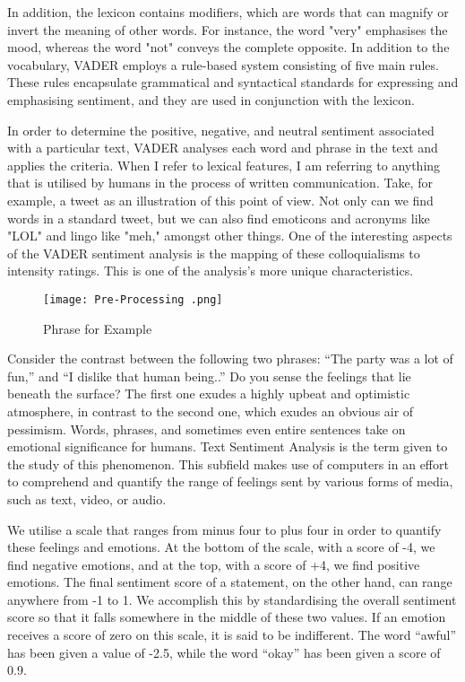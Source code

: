 \documentclass[12pt, a4paper,twoside]{report}
\theoremstyle{plain} %
\theoremstyle{definition} %
\theoremstyle{remark} %
\numberwithin{equation}{chapter}
\begin{document}
In addition, the lexicon contains modifiers, which are words that can magnify or invert the meaning of other words. For instance, the word "very" emphasises the mood, whereas the word "not" conveys the complete opposite. In addition to the vocabulary, VADER employs a rule-based system consisting of five main rules. These rules encapsulate grammatical and syntactical standards for expressing and emphasising sentiment, and they are used in conjunction with the lexicon. 

In order to determine the positive, negative, and neutral sentiment associated with a particular text, VADER analyses each word and phrase in the text and applies the criteria. When I refer to lexical features, I am referring to anything that is utilised by humans in the process of written communication. Take, for example, a tweet as an illustration of this point of view. Not only can we find words in a standard tweet, but we can also find emoticons and acronyms like "LOL" and lingo like "meh," amongst other things. One of the interesting aspects of the VADER sentiment analysis is the mapping of these colloquialisms to intensity ratings. This is one of the analysis's more unique characteristics.

\begin{figure}
    \centering
    \texttt{[image: Pre-Processing .png]}
    \caption{Phrase for Example}
    \label{fig:enter-label}
\end{figure}

Consider the contrast between the following two phrases: ``The party was a lot of fun,'' and ``I dislike that human being..'' Do you sense the feelings that lie beneath the surface? The first one exudes a highly upbeat and optimistic atmosphere, in contrast to the second one, which exudes an obvious air of pessimism. Words, phrases, and sometimes even entire sentences take on emotional significance for humans. Text Sentiment Analysis is the term given to the study of this phenomenon. This subfield makes use of computers in an effort to comprehend and quantify the range of feelings sent by various forms of media, such as text, video, or audio.

We utilise a scale that ranges from minus four to plus four in order to quantify these feelings and emotions. At the bottom of the scale, with a score of -4, we find negative emotions, and at the top, with a score of +4, we find positive emotions. The final sentiment score of a statement, on the other hand, can range anywhere from -1 to 1. We accomplish this by standardising the overall sentiment score so that it falls somewhere in the middle of these two values. If an emotion receives a score of zero on this scale, it is said to be indifferent. The word ``awful'' has been given a value of -2.5, while the word ``okay'' has been given a score of 0.9.
\end{document}
